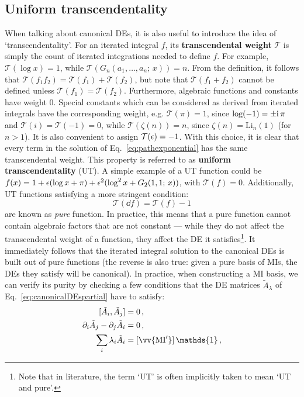 \documentclass[main.tex]{subfiles}
\begin{document}
\subsection{Uniform transcendentality} \label{sec:UT}
When talking about canonical DEs, it is also useful to introduce the idea of `transcendentality'. For an iterated integral $f$, its \textbf{transcendental weight} $\mathcal{T}$ is simply the count of iterated integrations needed to define $f$\cite{Henn:2013pwa}. For example, $\mathcal{T}(\log x) = 1$, while $\mathcal{T}(G_n(a_1, \ldots, a_n;\, x)) = n$. From the definition, it follows that $\mathcal{T}(f_1 f_2) = \mathcal{T}(f_1) + \mathcal{T}(f_2)$, but note that $\mathcal{T}(f_1 + f_2)$ cannot be defined unless $\mathcal{T}(f_1) = \mathcal{T}(f_2)$. Furthermore, algebraic functions and constants have weight 0. Special constants which can be considered as derived from iterated integrals have the corresponding weight, e.g. $\mathcal{T}(\pi) = 1$, since $\log (-1) = \pm \mathrm{i}\, \pi$ and $\mathcal{T}(i) = \mathcal{T}(-1) = 0$, while $\mathcal{T}(\zeta(n)) = n$, since $\zeta(n) = \text{Li}_n(1)$ (for $n>1$). It is also convenient to assign $\mathcal{T}(\epsilon)=-1$. With this choice, it is clear that every term in the solution of Eq.~\ref{eq:pathexponential} has the same transcendental weight. This property is referred to as \textbf{uniform transcendentality} (UT). A simple example of a UT function could be $f(x) = 1 + \epsilon (\log x + \pi) + \epsilon^2 (\log^2 x + G_2(1, 1;\, x))$, with $\mathcal{T}(f) = 0$. Additionally, 
UT functions satisfying a more stringent condition:
\begin{equation} \label{eq:purecondition}
    \mathcal{T}(\dd f) = \mathcal{T}(f) - 1
\end{equation}
are known as \textit{pure} function. In practice, this means that a pure function cannot contain algebraic factors that are not constant --- while they do not affect the transcendental weight of a function, they affect the DE it satisfies\footnote{Note that in literature, the term `UT' is often implicitly taken to mean `UT and pure'.}. It immediately follows that the iterated integral solution to the canonical DEs is built out of pure functions (the reverse is also true: given a pure basis of MIs, the DEs they satisfy will be canonical). In practice, when constructing a MI basis, we can verify its purity by checking a few conditions that the DE matrices $\tilde{A}_\lambda$ of Eq.~\ref{eq:canonicalDEspartial} have to satisfy:
\begin{subequations}
\begin{align}
    [ \tilde{A}_i, \tilde{A}_j] &= 0\,, \\
    \partial_i \tilde{A}_j - \partial_j \tilde{A}_i &= 0\,, \\
    \sum_i \lambda_i \tilde{A}_i &= [\vv{\text{MI}'}] \, \mathds{1} \,,
\end{align}
\end{subequations}
\end{document}
